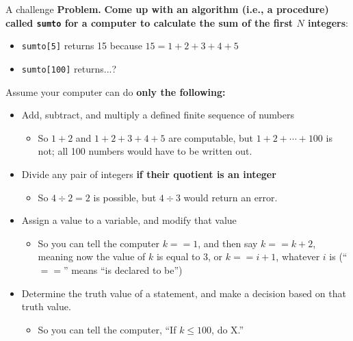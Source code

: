 \documentclass[11pt,aspectratio=1610,handout]{beamer}
\begin{document}
\begin{frame}[fragile]{A challenge}
		\textbf{Problem.} {\color{green!45!black} \textbf{Come up with an algorithm (i.e., a procedure) called \texttt{sumto} for a computer to calculate the sum of the first $N$ integers}:} \p
		\begin{itemize}
			\item \verb|sumto[5]| returns 15 because $15 = 1 + 2 + 3 + 4 + 5$ \p
			\item \verb|sumto[100]| returns...? \p
		\end{itemize}
		Assume your computer can do \textbf{only the following:} \p
		\begin{itemize}
			\item Add, subtract, and multiply a defined finite sequence of numbers \p
			\begin{itemize}
				\item So $1+2 $ and $1 + 2 + 3 + 4 + 5$ are computable, but $1 + 2 + \cdots + 100$ is not; all 100 numbers would have to be written out. \p
			\end{itemize}
			\item Divide any pair of integers \textbf{if their quotient is an integer}\p
			\begin{itemize}
				\item So $4 \div 2 = 2$ is possible, but $4 \div 3$ would return an error. \p 
			\end{itemize}
			\item Assign a value to a variable, and modify that value \p
			\begin{itemize}
				\item So you can tell the computer $k == 1$, and then say $k == k+2$, meaning now the value of $k$ is equal to 3, or $k == i+1$, whatever $i$ is (``$==$'' means ``is declared to be'') \p
			\end{itemize}
			\item Determine the truth value of a statement, and make a decision based on that truth value. \p
			\begin{itemize}
				\item So you can tell the computer, ``If $k \leq 100$, do X.''\p
			\end{itemize}
		\end{itemize}
\end{frame}
	
\end{document}
